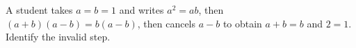 A student takes $a=b=1$ and writes $a^2=ab$, then $(a+b)(a-b)=b(a-b)$, then cancels $a-b$ to obtain $a+b=b$ and $2=1$. Identify the invalid step.
